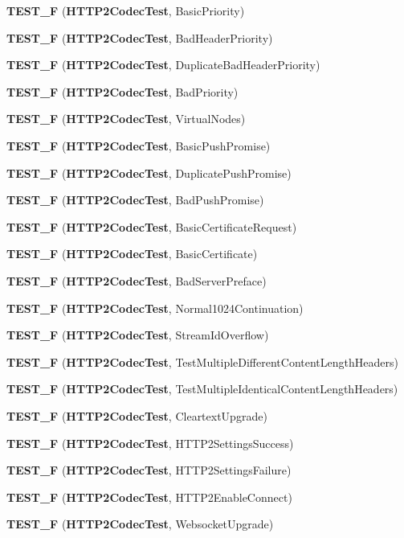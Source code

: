 \begin{DoxyCompactItemize}
{\bf T\+E\+S\+T\+\_\+F} ({\bf H\+T\+T\+P2\+Codec\+Test}, Basic\+Priority)
\item 
{\bf T\+E\+S\+T\+\_\+F} ({\bf H\+T\+T\+P2\+Codec\+Test}, Bad\+Header\+Priority)
\item 
{\bf T\+E\+S\+T\+\_\+F} ({\bf H\+T\+T\+P2\+Codec\+Test}, Duplicate\+Bad\+Header\+Priority)
\item 
{\bf T\+E\+S\+T\+\_\+F} ({\bf H\+T\+T\+P2\+Codec\+Test}, Bad\+Priority)
\item 
{\bf T\+E\+S\+T\+\_\+F} ({\bf H\+T\+T\+P2\+Codec\+Test}, Virtual\+Nodes)
\item 
{\bf T\+E\+S\+T\+\_\+F} ({\bf H\+T\+T\+P2\+Codec\+Test}, Basic\+Push\+Promise)
\item 
{\bf T\+E\+S\+T\+\_\+F} ({\bf H\+T\+T\+P2\+Codec\+Test}, Duplicate\+Push\+Promise)
\item 
{\bf T\+E\+S\+T\+\_\+F} ({\bf H\+T\+T\+P2\+Codec\+Test}, Bad\+Push\+Promise)
\item 
{\bf T\+E\+S\+T\+\_\+F} ({\bf H\+T\+T\+P2\+Codec\+Test}, Basic\+Certificate\+Request)
\item 
{\bf T\+E\+S\+T\+\_\+F} ({\bf H\+T\+T\+P2\+Codec\+Test}, Basic\+Certificate)
\item 
{\bf T\+E\+S\+T\+\_\+F} ({\bf H\+T\+T\+P2\+Codec\+Test}, Bad\+Server\+Preface)
\item 
{\bf T\+E\+S\+T\+\_\+F} ({\bf H\+T\+T\+P2\+Codec\+Test}, Normal1024\+Continuation)
\item 
{\bf T\+E\+S\+T\+\_\+F} ({\bf H\+T\+T\+P2\+Codec\+Test}, Stream\+Id\+Overflow)
\item 
{\bf T\+E\+S\+T\+\_\+F} ({\bf H\+T\+T\+P2\+Codec\+Test}, Test\+Multiple\+Different\+Content\+Length\+Headers)
\item 
{\bf T\+E\+S\+T\+\_\+F} ({\bf H\+T\+T\+P2\+Codec\+Test}, Test\+Multiple\+Identical\+Content\+Length\+Headers)
\item 
{\bf T\+E\+S\+T\+\_\+F} ({\bf H\+T\+T\+P2\+Codec\+Test}, Cleartext\+Upgrade)
\item 
{\bf T\+E\+S\+T\+\_\+F} ({\bf H\+T\+T\+P2\+Codec\+Test}, H\+T\+T\+P2\+Settings\+Success)
\item 
{\bf T\+E\+S\+T\+\_\+F} ({\bf H\+T\+T\+P2\+Codec\+Test}, H\+T\+T\+P2\+Settings\+Failure)
\item 
{\bf T\+E\+S\+T\+\_\+F} ({\bf H\+T\+T\+P2\+Codec\+Test}, H\+T\+T\+P2\+Enable\+Connect)
\item 
{\bf T\+E\+S\+T\+\_\+F} ({\bf H\+T\+T\+P2\+Codec\+Test}, Websocket\+Upgrade)
\item 

\end{DoxyCompactItemize}
